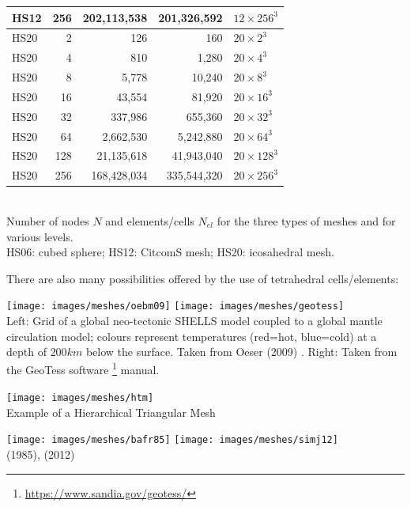 \begin{center}
\begin{tabular}{lrrrl}
HS12 & 256  &  202,113,538  & 201,326,592  &  $12\times 256^3$ \\
\hline
HS20 & 
2     &         126  &         160   & $20 \times 2^3$ \\
HS20 & 
4     &         810  &       1,280   & $20 \times 4^3$ \\
HS20 & 
8     &       5,778  &      10,240   & $20 \times 8^3$ \\
HS20 & 
16    &      43,554  &      81,920   & $20 \times 16^3$ \\
HS20 & 
32    &     337,986  &     655,360   & $20 \times 32^3$ \\
HS20 & 
64    &   2,662,530  &   5,242,880   & $20 \times 64^3$ \\
HS20 & 
128   &  21,135,618  &  41,943,040   & $20 \times 128^3$ \\
HS20 & 
256   & 168,428,034  & 335,544,320   & $20 \times 256^3$ \\
\hline
\end{tabular}\\
{\captionfont Number of nodes $N$ and elements/cells $N_{el}$ for the three types of meshes and for various 
levels.\\ HS06: cubed sphere; HS12: CitcomS mesh; HS20: icosahedral mesh.}
\end{center}

There are also many possibilities offered by the use of tetrahedral cells/elements:


\begin{center}
\texttt{[image: images/meshes/oebm09]}
\texttt{[image: images/meshes/geotess]}\\
{\captionfont Left: Grid of a global neo-tectonic SHELLS model coupled to a global mantle
circulation model; colours represent temperatures (red=hot, blue=cold)
at a depth of $200\si{km}$ below the surface. Taken from Oeser \etal (2009) \cite{oebm09}.
Right: Taken from the GeoTess software \footnote{\url{https://www.sandia.gov/geotess/}} manual.}
\end{center}


\begin{center}
\texttt{[image: images/meshes/htm]}\\
{\captionfont Example of a Hierarchical Triangular Mesh}
\end{center}


\begin{center}
\texttt{[image: images/meshes/bafr85]}
\texttt{[image: images/meshes/simj12]}\\
{\captionfont \textcite{bafr85} (1985), \textcite{simj12} (2012)}
\end{center}


